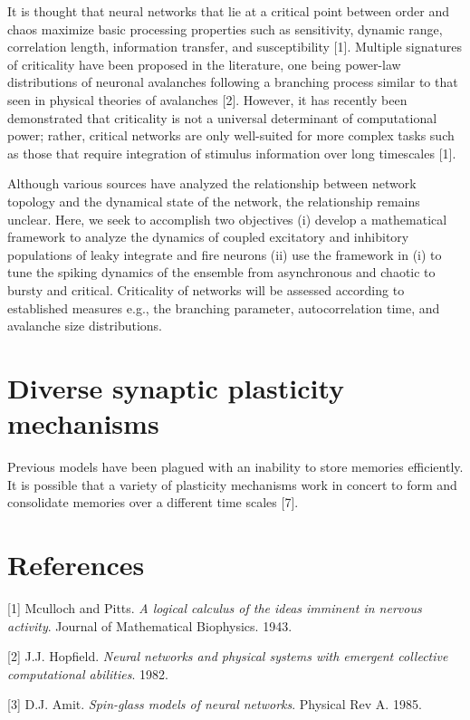 \documentclass{article} %
\begin{document}
It is thought that neural networks that lie at a critical point between order and chaos maximize basic processing properties such as sensitivity, dynamic range, correlation length, information transfer, and susceptibility [1]. Multiple signatures of criticality have been proposed in the literature, one being power-law distributions of neuronal avalanches following a branching process similar to that seen in physical theories of avalanches [2]. However, it has recently been demonstrated that criticality is not a universal determinant of computational power; rather, critical networks are only well-suited for more complex tasks such as those that require integration of stimulus information over long timescales [1]. 

Although various sources have analyzed the relationship between network topology and the dynamical state of the network, the relationship remains unclear. Here, we seek to accomplish two objectives (i) develop a mathematical framework to analyze the dynamics of coupled excitatory and inhibitory populations of leaky integrate and fire neurons (ii) use the framework in (i) to tune the spiking dynamics of the ensemble from asynchronous and chaotic to bursty and critical. Criticality of networks will be assessed according to established measures e.g., the branching parameter, autocorrelation time, and avalanche size distributions. 

\section{Diverse synaptic plasticity mechanisms}

Previous models have been plagued with an inability to store memories efficiently. It is possible that a variety of plasticity mechanisms work in concert to form and consolidate memories over a different time scales [7].



\section*{References}

[1] Mculloch and Pitts. \textit{A logical calculus of the ideas imminent in nervous activity}. Journal of Mathematical Biophysics. 1943.

[2] J.J. Hopfield. \textit{Neural networks and physical systems with emergent collective computational abilities}. 1982.

[3] D.J. Amit. \textit{Spin-glass models of neural networks}. Physical Rev A. 1985.
\end{document}
